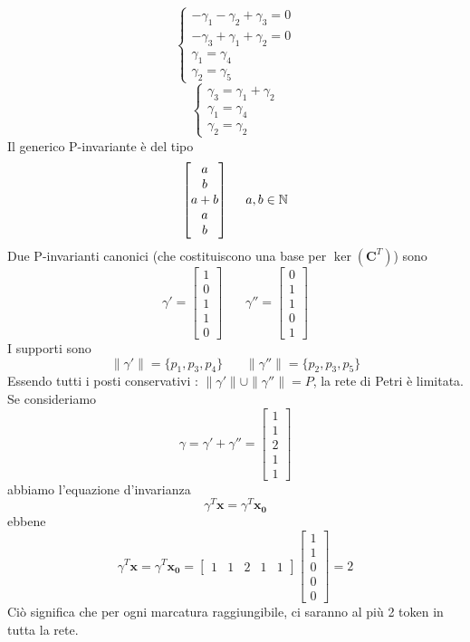 \documentclass[10pt, letterpaper]{report}
\begin{document}
$$\begin{cases}
    -\gamma_1-\gamma_2+\gamma_3=0\\ 
    -\gamma_3+\gamma_1+\gamma_2=0\\ 
    \gamma_1=\gamma_4\\ 
    \gamma_2=\gamma_5
\end{cases} $$
$$\begin{cases}
    \gamma_3=\gamma_1+\gamma_2\\ 
    \gamma_1=\gamma_4\\ 
    \gamma_2=\gamma_2
\end{cases} $$
Il generico P-invariante è del tipo 
$$\begin{bmatrix}
    a \\ 
    b \\ 
    a+b \\ 
    a \\ 
    b
\end{bmatrix} \ \ \ \ a,b\in{\mathbb N}$$
Due P-invarianti canonici (che costituiscono una base per $\ker(\mathbf C^T)$) sono 
$$\gamma'=\begin{bmatrix}
    1 \\ 
    0 \\ 
    1 \\ 
    1 \\ 
    0
\end{bmatrix} 
\ \ \ \ \ \ \ \
\gamma''=\begin{bmatrix}
    0 \\ 
    1 \\ 
    1 \\ 
   0 \\ 
    1
\end{bmatrix}$$
I supporti sono 
$$\|\gamma'\|=\{p_1,p_3,p_4\} \ \ \ \ \ \ \ \ \|\gamma''\|=\{p_2,p_3,p_5\}$$
Essendo tutti i posti conservativi : $\|\gamma'\|\cup \|\gamma''\|=P$, la rete di Petri è limitata. Se consideriamo 
$$\gamma=\gamma'+\gamma''= \begin{bmatrix}
    1 \\ 
    1 \\ 
    2 \\ 
   1 \\ 
    1
\end{bmatrix}$$
abbiamo l'equazione d'invarianza 
$$ \gamma^T\mathbf x = \gamma^T\mathbf{x_0}$$
ebbene 
$$ \gamma^T\mathbf x =
\gamma^T\mathbf{x_0}=\begin{bmatrix}
    1 &
    1 &
    2 & 
   1& 
    1
\end{bmatrix}\begin{bmatrix}
    1\\ 1\\ 0\\ 0 \\ 0
\end{bmatrix} =2
$$
Ciò significa che per ogni marcatura raggiungibile, ci saranno al più 2 token in tutta la rete.
\end{document}
